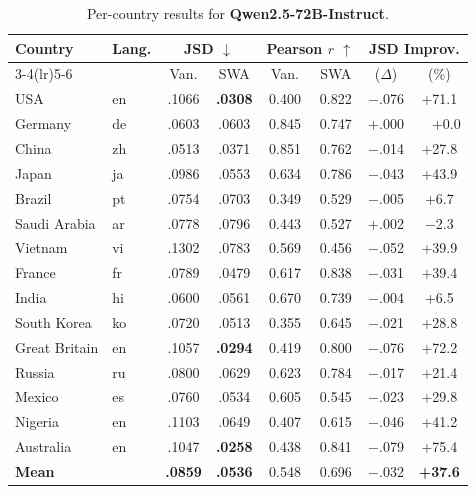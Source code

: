 \documentclass{article}
\newcommand{\gain}[1]{\textcolor{improvegreen}{#1}}
\newcommand{\loss}[1]{\textcolor{worsered}{#1}}
\begin{document}
\begin{table}[h]
\caption{Per-country results for \textbf{Qwen2.5-72B-Instruct}.}
\label{tab:percountry_qwen72b_app}
\centering\setlength{\tabcolsep}{3.5pt}\footnotesize
\begin{tabular}{llcccccc}
\toprule
Country & Lang. & \multicolumn{2}{c}{JSD $\downarrow$} & \multicolumn{2}{c}{Pearson $r$ $\uparrow$} & \multicolumn{2}{c}{JSD Improv.} \\
\cmidrule(lr){3-4}\cmidrule(lr){5-6}
 & & Van. & SWA & Van. & SWA & ($\Delta$) & (\%) \\
\midrule
USA & en &.1066 & \textbf{.0308} & 0.400 & 0.822 & $-$.076 & \gain{+71.1} \\
Germany & de &.0603 &.0603 & 0.845 & 0.747 & +.000 & ~~+0.0 \\
China & zh &.0513 &.0371 & 0.851 & 0.762 & $-$.014 & \gain{+27.8} \\
Japan & ja &.0986 &.0553 & 0.634 & 0.786 & $-$.043 & \gain{+43.9} \\
Brazil & pt &.0754 &.0703 & 0.349 & 0.529 & $-$.005 & \gain{+6.7} \\
Saudi Arabia & ar &.0778 &.0796 & 0.443 & 0.527 & +.002 & \loss{$-$2.3}\\
Vietnam & vi &.1302 &.0783 & 0.569 & 0.456 & $-$.052 & \gain{+39.9} \\
France & fr &.0789 &.0479 & 0.617 & 0.838 & $-$.031 & \gain{+39.4} \\
India & hi &.0600 &.0561 & 0.670 & 0.739 & $-$.004 & \gain{+6.5} \\
South Korea & ko &.0720 &.0513 & 0.355 & 0.645 & $-$.021 & \gain{+28.8} \\
Great Britain& en &.1057 & \textbf{.0294} & 0.419 & 0.800 & $-$.076 & \gain{+72.2} \\
Russia & ru &.0800 &.0629 & 0.623 & 0.784 & $-$.017 & \gain{+21.4} \\
Mexico & es &.0760 &.0534 & 0.605 & 0.545 & $-$.023 & \gain{+29.8} \\
Nigeria & en &.1103 &.0649 & 0.407 & 0.615 & $-$.046 & \gain{+41.2} \\
Australia & en &.1047 & \textbf{.0258} & 0.438 & 0.841 & $-$.079 & \gain{+75.4} \\
\midrule
\textbf{Mean} & & \textbf{.0859} & \textbf{.0536} & 0.548 & 0.696 & $-$.032 & \gain{\textbf{+37.6}} \\
\bottomrule
\end{tabular}
\end{table}
\end{document}
